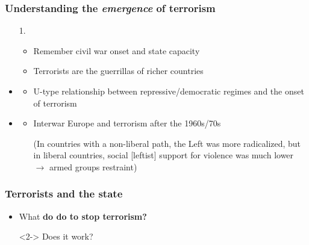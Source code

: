 \documentclass[aspectratio=43]{beamer}
\begin{document}
\begin{frame}
\frametitle{Understanding the \textit{emergence} of terrorism}
\centering

\begin{itemize}
  \item[1.] 
  \begin{itemize}
    \item Remember civil war onset and state capacity
    \item Terrorists are the guerrillas of richer countries
  \end{itemize}
  \item<2->[2.] 
  \begin{itemize}
    \item U-type relationship between repressive/democratic regimes and the onset of terrorism
  \end{itemize}
  \item<3->[3.] 
  \begin{itemize}
    \item Interwar Europe and terrorism after the 1960s/70s
    \item[] {\scriptsize (In countries with a non-liberal path, the Left was more radicalized, but in liberal countries, social [leftist] support for violence was much lower $\rightarrow$ armed groups restraint)}
  \end{itemize}
\end{itemize}


\end{frame}

\begin{frame}
\frametitle{Terrorists and the state}
\centering

\begin{itemize}
  \item What \textbf{do {\color{red}{states}} do to stop terrorism?}
  \item[]<2-> Does it work?
\end{itemize}

\end{frame}
\end{document}
